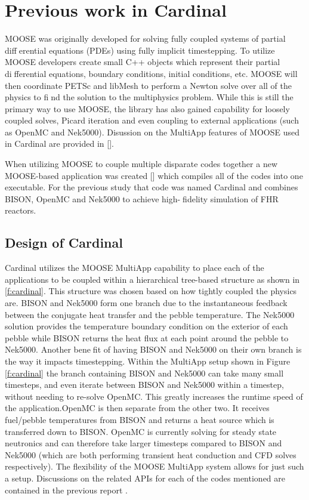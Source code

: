 \section{Previous work in Cardinal}
\label{s:cardinal}

MOOSE was originally developed for solving fully coupled systems of partial differential equations (PDEs)
using fully implicit timestepping. To utilize MOOSE developers create small C++ objects which represent
their partial differential equations, boundary conditions, initial conditions, etc. MOOSE will then coordinate PETSc and libMesh to perform a Newton solve over all of the physics to find the solution to the multiphysics problem. While this is still the primary way to use MOOSE, the library has also gained capability for loosely coupled solves, Picard iteration and even coupling to external applications (such as OpenMC and Nek5000).
Disussion on the MultiApp features of MOOSE used in Cardinal are provided in [].

When utilizing MOOSE to couple multiple disparate codes together a new MOOSE-based application was created [] which compiles all of the codes into one executable. For the previous study that code was  named Cardinal and combines BISON, OpenMC and Nek5000 to achieve high-fidelity simulation of FHR reactors.

\subsection{Design of Cardinal}
\label{ss:c1}

Cardinal utilizes the MOOSE MultiApp capability to place each of the applications to be coupled within
a hierarchical tree-based structure as shown in \ref{f:cardinal}. This structure was chosen based on how tightly
coupled the physics are. BISON and Nek5000 form one branch due to the instantaneous feedback between the conjugate heat transfer and the pebble temperature. The Nek5000 solution provides the temperature boundary condition on the exterior of each pebble while BISON returns the heat  flux at each point around
the pebble to Nek5000. Another benefit of having BISON and Nek5000 on their own branch is the way it impacts timestepping. Within the MultiApp setup shown in Figure \ref{f:cardinal} the branch containing BISON and Nek5000 can take many small timesteps, and even iterate between BISON and Nek5000 within a timestep, without needing to re-solve OpenMC. This greatly increases the runtime speed of the application.OpenMC is then separate from the other two. It receives fuel/pebble temperatures from BISON and returns a heat source which is transferred down to BISON. OpenMC is currently solving for steady state neutronics and can therefore take larger timesteps compared to BISON and Nek5000 (which are both performing transient heat conduction and CFD solves respectively). The flexibility of the MOOSE MultiApp system allows for just such a setup. Discussions on the related APIs for each of the codes mentioned are contained in the previous report \cite{cardinal}.

